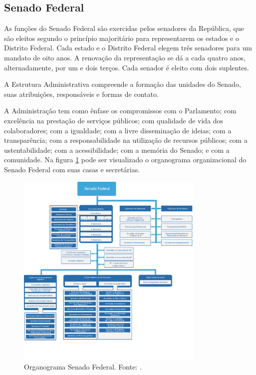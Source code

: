 \subsection{Senado Federal}

As funções do Senado Federal são exercidas pelos senadores da República, que são eleitos segundo o princípio majoritário para representarem os estados e o Distrito Federal. Cada estado e o Distrito Federal elegem três senadores para um mandato de oito anos. A renovação da representação se dá a cada quatro anos, alternadamente, por um e dois terços. Cada senador é eleito com dois suplentes.

A Estrutura Administrativa compreende a formação das unidades do Senado, suas
atribuições, responsáveis e formas de contato.

A Administração tem como ênfase os compromissos com o Parlamento; com excelência na prestação de serviços públicos; com qualidade de vida dos colaboradores; com a igualdade; com a livre disseminação de ideias; com a transparência; com a responsabilidade na utilização
de recursos públicos; com a ustentabilidade; com a acessibilidade; com a memória do Senado; e com a comunidade. Na figura \ref{img:organograma_senado} pode ser visualizado o organograma organizacional do Senado Federal com suas casas e secretárias.

\begin{figure}[H]
	\centering
	\includegraphics[width=0.8\textwidth]{figuras/organograma_senado.png}
	\caption{Organograma Senado Federal. Fonte: \cite{organograma_senado}.}
	\label{img:organograma_senado}
\end{figure}

